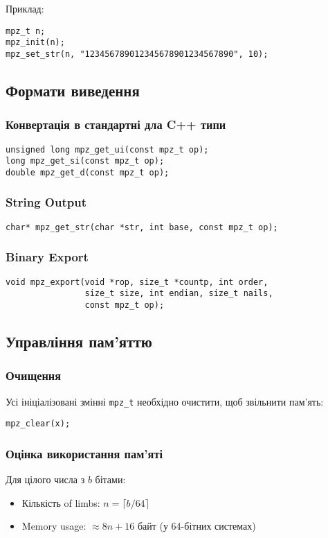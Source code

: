 Приклад:
\begin{verbatim}
mpz_t n;
mpz_init(n);
mpz_set_str(n, "123456789012345678901234567890", 10);
\end{verbatim}

\subsection{Формати виведення}

\subsubsection{Конвертація в стандартні дла C++ типи}
\begin{verbatim}
unsigned long mpz_get_ui(const mpz_t op);
long mpz_get_si(const mpz_t op);
double mpz_get_d(const mpz_t op);
\end{verbatim}

\subsubsection{String Output}
\begin{verbatim}
char* mpz_get_str(char *str, int base, const mpz_t op);
\end{verbatim}

\subsubsection{Binary Export}
\begin{verbatim}
void mpz_export(void *rop, size_t *countp, int order, 
                size_t size, int endian, size_t nails, 
                const mpz_t op);
\end{verbatim}

\subsection{Управління пам'яттю}

\subsubsection{Очищення}
Усі ініціалізовані змінні \texttt{mpz\_t} необхідно очистити, щоб звільнити пам'ять:
\begin{verbatim}
mpz_clear(x);
\end{verbatim}

\subsubsection{Оцінка використання пам'яті}
Для цілого числа з $b$ бітами:
\begin{itemize}
    \item Кількість of limbs: $n = \lceil b / 64 \rceil$
    \item Memory usage: $\approx 8n + 16$ байт (у 64-бітних системах)
\end{itemize}

